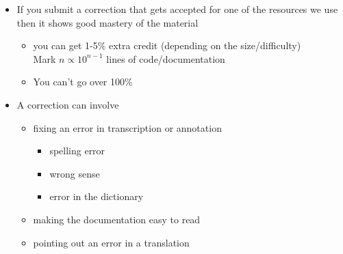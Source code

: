 \documentclass[a4paper,landscape,headrule,footrule,xetex,25pt]{foils}
\begin{document}
\begin{itemize}
\item If you submit a correction that gets accepted for one of the
  resources we use then it shows good mastery of the material
  \begin{itemize}
  \item you can get 1-5\% extra credit (depending on the size/difficulty)
\\ Mark $n \propto 10^{n-1}$ lines of code/documentation
  \item You can't go over 100\%
  \end{itemize}
\item A correction can involve
  \begin{itemize}
  \item fixing an error in transcription or annotation
    \begin{itemize}
    \item spelling error
    \item wrong sense
    \item error in the dictionary
    \end{itemize}
  \item making the documentation easy to read
  \item pointing out an error in a translation
  \end{itemize}

\end{itemize}



\end{document}

